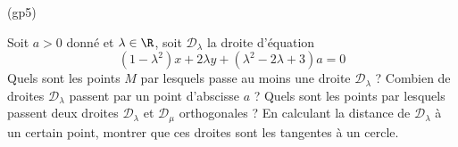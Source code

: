 \begin{tiny}(gp5)\end{tiny}
Soit $a>0$ donn{\'e} et $\lambda \in \R$, soit $\mathcal{D}_{\lambda }$ la droite d'{\'e}quation
\[
(1-\lambda ^{2})x+2\lambda y+(\lambda ^{2}-2\lambda +3)a=0
\]
Quels sont les points $M$ par lesquels passe au moins une droite $\mathcal{D}_{\lambda }$ ? Combien de droites $\mathcal D_\lambda$ passent par un point d'abscisse $a$ ? Quels sont les points par lesquels passent deux droites $\mathcal{D}_{\lambda }$  et $\mathcal{D}_{\mu}$ orthogonales ? En calculant la distance de $\mathcal D_\lambda$ à un certain point, montrer que ces droites sont les tangentes à un cercle.